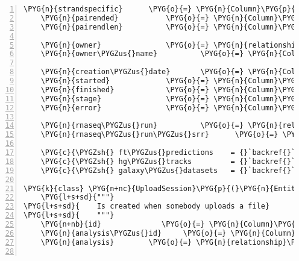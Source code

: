 \begin{Verbatim}[commandchars=\\\{\},numbers=left,firstnumber=1,stepnumber=5]
    \PYG{n}{strandspecific}      \PYG{o}{=} \PYG{n}{Column}\PYG{p}{(}\PYG{n}{Boolean}\PYG{p}{)}
    \PYG{n}{pairended}           \PYG{o}{=} \PYG{n}{Column}\PYG{p}{(}\PYG{n}{Boolean}\PYG{p}{)}
    \PYG{n}{pairendlen}          \PYG{o}{=} \PYG{n}{Column}\PYG{p}{(}\PYG{n}{Integer}\PYG{p}{)}

    \PYG{n}{owner}               \PYG{o}{=} \PYG{n}{relationship}\PYG{p}{(}\PYG{l+s}{"}\PYG{l+s}{User}\PYG{l+s}{"}\PYG{p}{,} \PYG{n}{backref}\PYG{o}{=}\PYG{n}{backref}\PYG{p}{(}\PYG{l+s}{"}\PYG{l+s}{analyses}\PYG{l+s}{"}\PYG{p}{)}\PYG{p}{)}
    \PYG{n}{owner\PYGZus{}name}          \PYG{o}{=} \PYG{n}{Column}\PYG{p}{(}\PYG{n}{String}\PYG{p}{,} \PYG{n}{ForeignKey}\PYG{p}{(}\PYG{l+s}{'}\PYG{l+s}{user.name}\PYG{l+s}{'}\PYG{p}{)}\PYG{p}{)}

    \PYG{n}{creation\PYGZus{}date}       \PYG{o}{=} \PYG{n}{Column}\PYG{p}{(}\PYG{n}{DateTime}\PYG{p}{)}
    \PYG{n}{started}             \PYG{o}{=} \PYG{n}{Column}\PYG{p}{(}\PYG{n}{Boolean}\PYG{p}{)}
    \PYG{n}{finished}            \PYG{o}{=} \PYG{n}{Column}\PYG{p}{(}\PYG{n}{Boolean}\PYG{p}{)}
    \PYG{n}{stage}               \PYG{o}{=} \PYG{n}{Column}\PYG{p}{(}\PYG{n}{String}\PYG{p}{)}
    \PYG{n}{error}               \PYG{o}{=} \PYG{n}{Column}\PYG{p}{(}\PYG{n}{String}\PYG{p}{)}

    \PYG{n}{rnaseq\PYGZus{}run}          \PYG{o}{=} \PYG{n}{relationship}\PYG{p}{(}\PYG{l+s}{"}\PYG{l+s}{RNASeqRun}\PYG{l+s}{"}\PYG{p}{,} \PYG{n}{backref}\PYG{o}{=}\PYG{n}{backref}\PYG{p}{(}\PYG{l+s}{"}\PYG{l+s}{analyses}\PYG{l+s}{"}\PYG{p}{)}\PYG{p}{)}
    \PYG{n}{rnaseq\PYGZus{}run\PYGZus{}srr}      \PYG{o}{=} \PYG{n}{Column}\PYG{p}{(}\PYG{n}{String}\PYG{p}{,} \PYG{n}{ForeignKey}\PYG{p}{(}\PYG{l+s}{'}\PYG{l+s}{rnaseqrun.srr}\PYG{l+s}{'}\PYG{p}{)}\PYG{p}{)}

    \PYG{c}{\PYGZsh{} ft\PYGZus{}predictions    = {}`backref{}` from FeaturePredictions}
    \PYG{c}{\PYGZsh{} hg\PYGZus{}tracks         = {}`backref{}` from HgTrack}
    \PYG{c}{\PYGZsh{} galaxy\PYGZus{}datasets   = {}`backref{}` from GalaxyDataset}

\PYG{k}{class} \PYG{n+nc}{UploadSession}\PYG{p}{(}\PYG{n}{Entity}\PYG{p}{)}\PYG{p}{:}
    \PYG{l+s+sd}{"""}
\PYG{l+s+sd}{    Is created when somebody uploads a file}
\PYG{l+s+sd}{    """}
    \PYG{n+nb}{id}              \PYG{o}{=} \PYG{n}{Column}\PYG{p}{(}\PYG{n}{Integer}\PYG{p}{,} \PYG{n}{primary\PYGZus{}key}\PYG{o}{=}\PYG{n+nb+bp}{True}\PYG{p}{)}
    \PYG{n}{analysis\PYGZus{}id}     \PYG{o}{=} \PYG{n}{Column}\PYG{p}{(}\PYG{n}{Integer}\PYG{p}{,} \PYG{n}{ForeignKey}\PYG{p}{(}\PYG{n}{Analysis}\PYG{o}{.}\PYG{n}{id}\PYG{p}{)}\PYG{p}{)}
    \PYG{n}{analysis}        \PYG{o}{=} \PYG{n}{relationship}\PYG{p}{(}\PYG{n}{Analysis}\PYG{p}{,} \PYG{n}{uselist}\PYG{o}{=}\PYG{n+nb+bp}{False}\PYG{p}{)}


\end{Verbatim}
